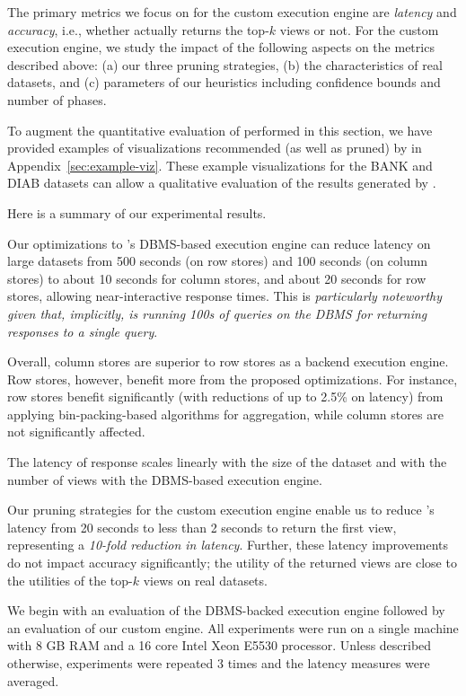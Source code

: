 The primary metrics we focus on for the custom execution engine
are {\em latency} and {\em accuracy}, i.e., whether \SeeDB
actually returns the top-$k$ views or not.
For the custom execution engine, we study the impact of the following
aspects on the metrics described above:
(a) our three pruning strategies, 
(b) the characteristics of real datasets, and (c) parameters of our heuristics
including confidence bounds and number of phases.

To augment the quantitative evaluation of \SeeDB performed in this section, we
have provided examples of visualizations recommended (as well as pruned) by \SeeDB in
Appendix~\ref{sec:example-viz}. 
These example visualizations for the BANK and DIAB datasets can allow a
qualitative evaluation of the results generated by \SeeDB.

Here is a summary of our experimental results. 
\begin{denselist}
\item Our optimizations to \SeeDB's DBMS-based execution engine can reduce
latency on large datasets from 500 seconds (on row stores) and 100 seconds (on column stores)
to about 10 seconds for column stores, and about 20 seconds for row stores,
allowing near-interactive response times. This is {\em particularly noteworthy given that, implicitly,
\SeeDB is running 100s of queries on the DBMS for returning responses to a single \SeeDB query}.

\item Overall, column stores are superior to row stores 
as a backend execution engine. Row stores, however, benefit more from the
proposed optimizations. For instance, row stores benefit
significantly (with reductions of up to 2.5\% on latency) from applying
bin-packing-based algorithms for aggregation, 
while column stores are not significantly affected. 

\item The latency of response scales linearly 
with the size of the dataset and with the number of views with
the DBMS-based execution engine.

\item Our pruning strategies for the custom execution engine 
enable us to reduce \SeeDB's latency from 20 seconds to less than 2 seconds
to return the first view, representing a {\em 10-fold reduction in latency}.
Further, these latency improvements do not impact accuracy significantly;
the utility of the returned views are close to the utilities
of the top-$k$ views on real datasets.

\end{denselist}
We begin with an evaluation of the DBMS-backed execution engine followed by an
evaluation of our custom engine. All experiments were run on a 
single machine with 8 GB RAM and a 16 core Intel Xeon E5530 processor. 
Unless described otherwise, experiments were 
repeated 3 times and the latency measures were
averaged.

